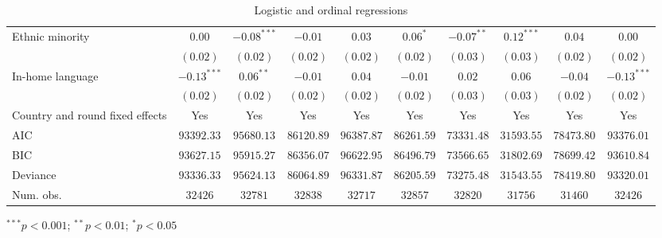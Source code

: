 \begin{table}
\begin{center}
\begin{threeparttable}
\begin{tabular}{l c c c c c c c c c}
Ethnic minority                 & $0.00$        & $-0.08^{***}$ & $-0.01$       & $0.03$        & $0.06^{*}$    & $-0.07^{**}$  & $0.12^{***}$  & $0.04$        & $0.00$        \\
                                & $(0.02)$      & $(0.02)$      & $(0.02)$      & $(0.02)$      & $(0.02)$      & $(0.03)$      & $(0.03)$      & $(0.02)$      & $(0.02)$      \\
In-home language                & $-0.13^{***}$ & $0.06^{**}$   & $-0.01$       & $0.04$        & $-0.01$       & $0.02$        & $0.06$        & $-0.04$       & $-0.13^{***}$ \\
                                & $(0.02)$      & $(0.02)$      & $(0.02)$      & $(0.02)$      & $(0.02)$      & $(0.03)$      & $(0.03)$      & $(0.02)$      & $(0.02)$      \\
\midrule
Country and round fixed effects & Yes           & Yes           & Yes           & Yes           & Yes           & Yes           & Yes           & Yes           & Yes           \\
AIC                             & $93392.33$    & $95680.13$    & $86120.89$    & $96387.87$    & $86261.59$    & $73331.48$    & $31593.55$    & $78473.80$    & $93376.01$    \\
BIC                             & $93627.15$    & $95915.27$    & $86356.07$    & $96622.95$    & $86496.79$    & $73566.65$    & $31802.69$    & $78699.42$    & $93610.84$    \\
Deviance                        & $93336.33$    & $95624.13$    & $86064.89$    & $96331.87$    & $86205.59$    & $73275.48$    & $31543.55$    & $78419.80$    & $93320.01$    \\
Num. obs.                       & $32426$       & $32781$       & $32838$       & $32717$       & $32857$       & $32820$       & $31756$       & $31460$       & $32426$       \\
\bottomrule
\end{tabular}
\begin{tablenotes}[flushleft]
\scriptsize{\item $^{***}p<0.001$; $^{**}p<0.01$; $^{*}p<0.05$}
\end{tablenotes}
\end{threeparttable}
\caption{Logistic and ordinal regressions}
\label{table:coefficients}
\end{center}
\end{table}
